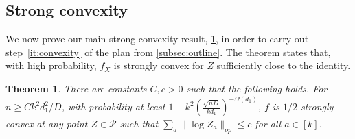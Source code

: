 \documentclass{article}
\newtheorem{theorem}{Theorem}
\newcommand\PD{\operatorname{P}}
\newcommand\SPD{\mathcal{P}}
\newcommand\samp{x}
\newcommand\rv{X}
\newcommand{\CF}[1]{{\color{purple}[CF: #1]}}
\begin{document}







\subsection{Strong convexity}




We now prove our main strong convexity result, \cref{thm:ball-convexity}, in order to carry out step~\cref{it:convexity} of the plan from \cref{subsec:outline}. The theorem states that, with high probability, $f_X$ is strongly convex for $Z$ sufficiently close to the identity.



\begin{theorem}\label{thm:ball-convexity} There are constants $C,c>0$ such that the following holds. For $n \geq C k^2 d_1^2/D$, with probability at least $1 - k^2 \left(\frac {\sqrt{nD}}{kd_1}\right)^{ - \Omega(d_1)}$, $f$ is $1/2$ strongly convex at any point $Z \in \SPD$ such that $\sum_a \|\log Z_a\|_{op} \leq c$ for all $a \in [k]$. 
\end{theorem}
\end{document}
